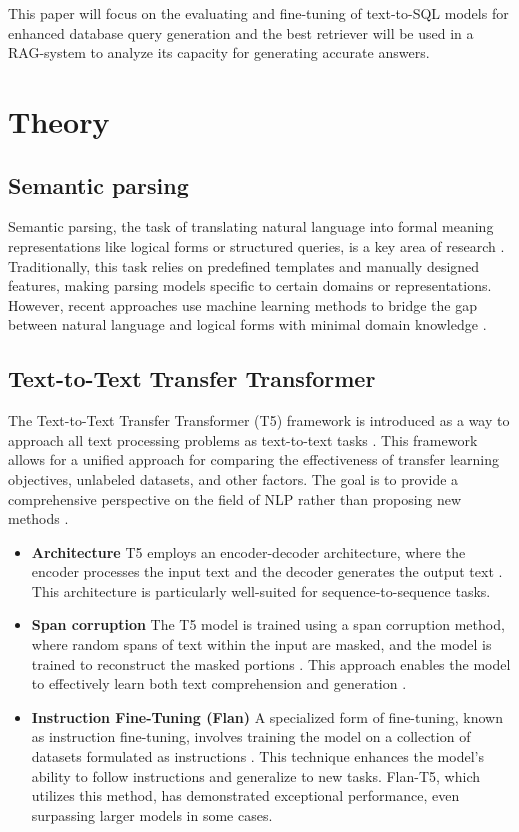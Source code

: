 \documentclass[11pt]{article}
\begin{document}
This paper will focus on the evaluating and fine-tuning of text-to-SQL models for enhanced database query generation and the best retriever will be used in a RAG-system to analyze its capacity for generating accurate answers.

\section{Theory}
\subsection{Semantic parsing}

Semantic parsing, the task of translating natural language into formal meaning representations like logical forms or structured queries, is a key area of research \cite{dong2016language}. Traditionally, this task relies on predefined templates and manually designed features, making parsing models specific to certain domains or representations. However, recent approaches use machine learning methods to bridge the gap between natural language and logical forms with minimal domain knowledge \cite{dong2016language}.

\subsection{Text-to-Text Transfer Transformer}

The Text-to-Text Transfer Transformer (T5) framework is introduced as a way to approach all text processing problems as text-to-text tasks \cite{TextTTextTransformer}. This framework allows for a unified approach for comparing the effectiveness of transfer learning objectives, unlabeled datasets, and other factors. The goal is to provide a comprehensive perspective on the field of NLP rather than proposing new methods \cite{dong2016language}.

\begin{itemize}

    \item \textbf{Architecture} T5 employs an encoder-decoder architecture, where the encoder processes the input text and the decoder generates the output text \cite{t5scaling}. This architecture is particularly well-suited for sequence-to-sequence tasks.  
    
    \item \textbf{Span corruption} The T5 model is trained using a span corruption method, where random spans of text within the input are masked, and the model is trained to reconstruct the masked portions \cite{dong2016language}. This approach enables the model to effectively learn both text comprehension and generation \cite{t5scaling}.  
    
    \item \textbf{Instruction Fine-Tuning (Flan)} A specialized form of fine-tuning, known as instruction fine-tuning, involves training the model on a collection of datasets formulated as instructions \cite{t5scaling}. This technique enhances the model's ability to follow instructions and generalize to new tasks. Flan-T5, which utilizes this method, has demonstrated exceptional performance, even surpassing larger models in some cases.
\end{itemize}
\end{document}
